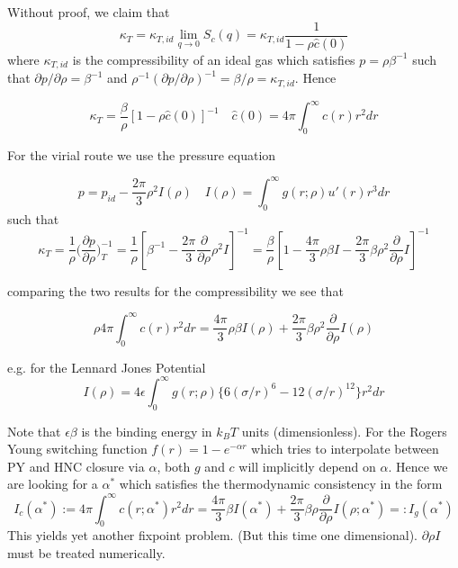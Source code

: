 \documentclass[11pt,a4paper]{article}
\begin{document}
Without proof, we claim that
\begin{equation}
\kappa_T = \kappa_{T, id} \lim_{q \rightarrow 0} S_c(q) = \kappa_{T, id} \frac{1}{1 - \rho \hat c(0)}
\end{equation}
where $\kappa_{T, id}$ is the compressibility of an ideal gas which satisfies $p= \rho \beta^{-1}$ such that $\partial p/\partial \rho = \beta^{-1}$
and $\rho^{-1}(\partial p/\partial \rho)^{-1} = \beta/\rho = \kappa_{T, id}$. Hence


\begin{equation}
\kappa_T = \frac{\beta}{\rho} [1 - \rho \hat c(0)]^{-1}  \quad
\hat c(0) = 4\pi \int_{0}^{\infty} c(r) r^2 dr 
\end{equation}

For the virial route we use the pressure equation

\begin{equation}
p = p_{id} - \frac{2\pi}{3} \rho^2 I(\rho) \quad
I(\rho) = \int_{0}^{\infty} g(r; \rho) u'(r) r^3 dr
\end{equation}
such that 
\begin{equation}
\kappa_T = 
\frac{1}{\rho} \bigg( \frac{\partial p}{\partial \rho} \bigg)_T^{-1} =
\frac{1}{\rho} [\beta^{-1} - \frac{2\pi}{3} \frac{\partial}{\partial \rho}  \rho^2  I]^{-1} =
\frac{\beta}{\rho} [1 - \frac{4\pi}{3} \rho \beta I - \frac{2\pi}{3} \beta \rho^2  \frac{\partial}{\partial \rho} I ]^{-1} 
\end{equation}

comparing the two results for the compressibility we see that

\begin{equation}
\rho 4\pi \int_{0}^{\infty} c(r) r^2 dr =
\frac{4\pi}{3} \rho \beta I(\rho) +
\frac{2\pi}{3} \beta \rho^2 \frac{\partial}{\partial \rho} I(\rho)
\end{equation}

e.g. for the Lennard Jones Potential
\begin{equation}
I(\rho) =
4 \epsilon \int_{0}^{\infty} g(r; \rho) \{6(\sigma/r)^6 - 12(\sigma/r)^{12} \} r^2 dr
\end{equation}

Note that $\epsilon \beta$ is the binding energy in $k_BT$ units (dimensionless). For the Rogers Young switching function $f(r) = 1 - e^{-\alpha r}$
which tries to interpolate between PY and HNC closure via $\alpha$, both $g$ and $c$ will implicitly depend on $\alpha$. Hence we are looking
for a $\alpha^{*}$ which satisfies the thermodynamic consistency in the form
\begin{equation}
I_c(\alpha^{*}) := 4 \pi\int_{0}^{\infty} c(r; \alpha^{*}) r^2 dr =
\frac{4\pi}{3} \beta I( \alpha^{*}) +
\frac{2\pi}{3} \beta \rho \frac{\partial}{\partial \rho} I(\rho;\alpha^{*})
=: I_g(\alpha^{*})
\end{equation}
This yields yet another fixpoint problem. (But this time one dimensional). $\partial \rho I$ must be treated numerically.
\end{document}
